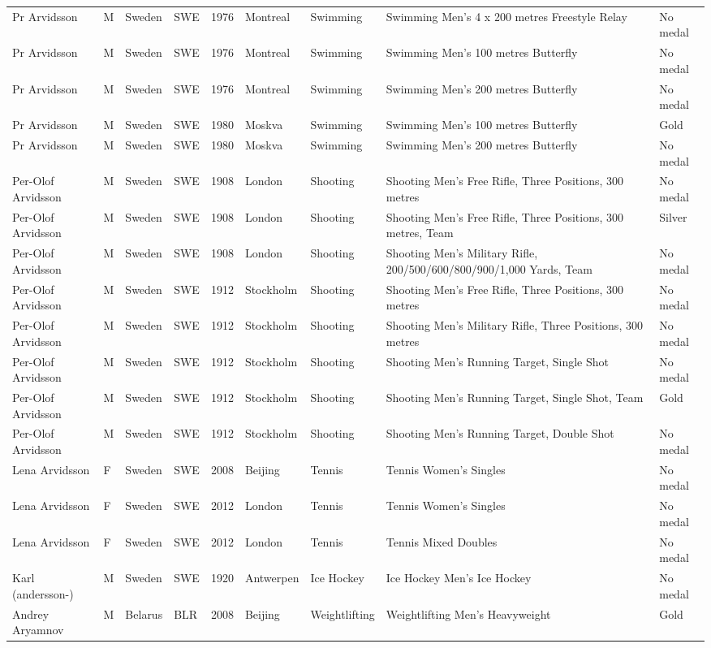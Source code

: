 \documentclass{article}%
\begin{document}
\begin{longtable}{l l l l l l l l l}
Pr Arvidsson&M&Sweden&SWE&1976&Montreal&Swimming&Swimming Men's 4 x 200 metres Freestyle Relay&No medal\\%
Pr Arvidsson&M&Sweden&SWE&1976&Montreal&Swimming&Swimming Men's 100 metres Butterfly&No medal\\%
Pr Arvidsson&M&Sweden&SWE&1976&Montreal&Swimming&Swimming Men's 200 metres Butterfly&No medal\\%
Pr Arvidsson&M&Sweden&SWE&1980&Moskva&Swimming&Swimming Men's 100 metres Butterfly&Gold\\%
Pr Arvidsson&M&Sweden&SWE&1980&Moskva&Swimming&Swimming Men's 200 metres Butterfly&No medal\\%
Per{-}Olof Arvidsson&M&Sweden&SWE&1908&London&Shooting&Shooting Men's Free Rifle, Three Positions, 300 metres&No medal\\%
Per{-}Olof Arvidsson&M&Sweden&SWE&1908&London&Shooting&Shooting Men's Free Rifle, Three Positions, 300 metres, Team&Silver\\%
Per{-}Olof Arvidsson&M&Sweden&SWE&1908&London&Shooting&Shooting Men's Military Rifle, 200/500/600/800/900/1,000 Yards, Team&No medal\\%
Per{-}Olof Arvidsson&M&Sweden&SWE&1912&Stockholm&Shooting&Shooting Men's Free Rifle, Three Positions, 300 metres&No medal\\%
Per{-}Olof Arvidsson&M&Sweden&SWE&1912&Stockholm&Shooting&Shooting Men's Military Rifle, Three Positions, 300 metres&No medal\\%
Per{-}Olof Arvidsson&M&Sweden&SWE&1912&Stockholm&Shooting&Shooting Men's Running Target, Single Shot&No medal\\%
Per{-}Olof Arvidsson&M&Sweden&SWE&1912&Stockholm&Shooting&Shooting Men's Running Target, Single Shot, Team&Gold\\%
Per{-}Olof Arvidsson&M&Sweden&SWE&1912&Stockholm&Shooting&Shooting Men's Running Target, Double Shot&No medal\\%
Lena Arvidsson&F&Sweden&SWE&2008&Beijing&Tennis&Tennis Women's Singles&No medal\\%
Lena Arvidsson&F&Sweden&SWE&2012&London&Tennis&Tennis Women's Singles&No medal\\%
Lena Arvidsson&F&Sweden&SWE&2012&London&Tennis&Tennis Mixed Doubles&No medal\\%
Karl (andersson{-})&M&Sweden&SWE&1920&Antwerpen&Ice Hockey&Ice Hockey Men's Ice Hockey&No medal\\%
Andrey Aryamnov&M&Belarus&BLR&2008&Beijing&Weightlifting&Weightlifting Men's Heavyweight&Gold\\%

\end{longtable}
\end{document}
